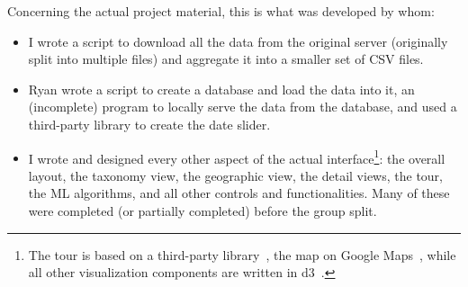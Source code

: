 \documentclass[letterpaper]{article} %
\begin{document}
Concerning the actual project material, this is what was developed by whom:

\begin{itemize}
  \item I wrote a script to download all the data from the original server
    (originally split into multiple files) and aggregate it into a smaller set
    of CSV files.
  \item Ryan wrote a script to create a database and load the data into it, an
    (incomplete) program to locally serve the data from the database, and used
    a third-party library to create the date slider.
  \item I wrote and designed every other aspect of the actual
    interface\footnote{The tour is based on a third-party
    library~\cite{bootstraptour}, the map on Google Maps~\cite{gmapsapi}, while
  all other visualization components are written in d3~\cite{d3}.}:  the overall
  layout, the taxonomy view, the geographic view, the detail views, the tour,
  the ML algorithms, and all other controls and functionalities.  Many of these
  were completed (or partially completed) before the group split.
\end{itemize}

{\footnotesize


}
\end{document}
